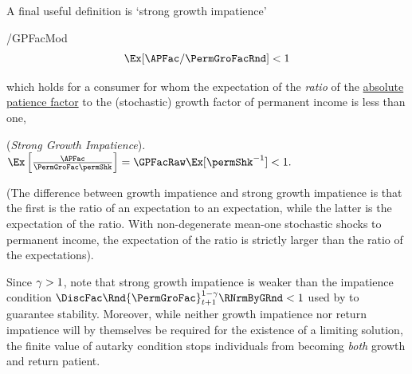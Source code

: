 \documentclass[BufferStockTheory]{subfiles}
\begin{document}
A final useful definition is `strong growth impatience'
\begin{verbatimwrite}{\EqDir/GPFacMod}
  \begin{equation}\label{eq:GPFacMod}
    \Ex[\APFac/\PermGroFacRnd] < 1
  \end{equation}
\end{verbatimwrite}

which holds for a consumer for whom the expectation of the \textit{ratio} of the \hyperlink{APFac}{absolute patience factor} to the (stochastic) growth factor of permanent income is less than one, 
\hypertarget{GICMod}{}
\begin{assumS}(\textit{Strong Growth Impatience}). \label{ass:GICMod}
$ \Ex\left[\frac{\APFac}{\PermGroFac \permShk}\right] = \GPFacMod  < 1.$
\end{assumS}

(The difference between growth impatience and strong growth impatience is that the first is the ratio of an expectation to an expectation, while the latter is the expectation of the ratio.
With non-degenerate mean-one stochastic shocks to permanent income, the expectation of the ratio is strictly larger than the ratio of the expectations).

Since $\gamma>1$, note that strong growth impatience is weaker than the impatience condition $\DiscFac \Rnd{\PermGroFac}_{t+1}^{1-\CRRA}\RNrmByGRnd<1$ used by \cite{mstIncFluct} to guarantee stability. Moreover, while neither growth impatience nor return impatience will by themselves be required for the existence of a limiting solution, the finite value of autarky condition stops individuals from becoming \textit{both} growth and return patient.
\end{document}
